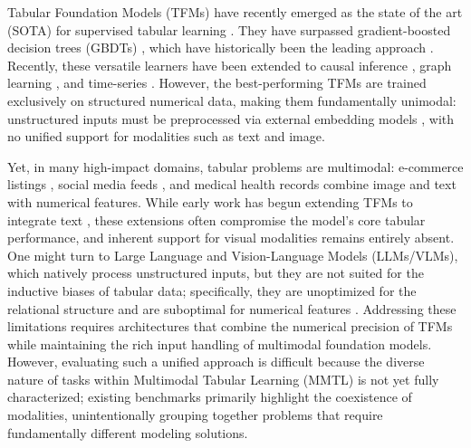 \documentclass{article}
\begin{document}
Tabular Foundation Models (TFMs) \cite{van_breugel_position_2024, hollmann_tabpfn_2022, hollmann_accurate_2025, qu_tabicl_2025, grinsztajn_tabpfn-25_2026, qu_tabiclv2_2026} have recently emerged as the state of the art (SOTA) for supervised tabular learning \cite{erickson_tabarena_2025, ye_closer_2025}. They have surpassed gradient-boosted decision trees (GBDTs) \cite{breiman_random_2001, chen_xgboost_2016, ke_lightgbm_2017, prokhorenkova_catboost_2018}, which have historically been the leading approach \cite{shwartz-ziv_tabular_2022, grinsztajn_why_2022, mcelfresh_when_2023}. Recently, these versatile learners have been extended to causal inference \cite{robertson_-pfn_2025}, graph learning \cite{hayler_bringing_2025}, and time-series \cite{hoo2024tabular}. However, the best-performing TFMs \cite{grinsztajn_tabpfn-25_2026, qu_tabiclv2_2026} are trained exclusively on structured numerical data, making them fundamentally unimodal: unstructured inputs must be preprocessed via external embedding models \cite{wang_text_2024, simeoni_dinov3_2025}, with no unified support for modalities such as text and image.

Yet, in many high-impact domains, tabular problems are multimodal: e-commerce listings \cite{das2024towards, sukel2024multimodal, shapira2024can}, social media feeds \cite{meghawat2018multimodal, ophir2020deep, badian2023social}, and medical health records \cite{huang_fusion_2020, cui_deep_2023, duenias_hyperfusion_2025, fu_unleashing_2025} combine image and text with numerical features. While early work has begun extending TFMs to integrate text \cite{arazi_tabstar_2025, spinaci_contexttab_2025}, these extensions often compromise the model's core tabular performance, and inherent support for visual modalities remains entirely absent. One might turn to Large Language and Vision-Language Models (LLMs/VLMs), which natively process unstructured inputs, but they are not suited for the inductive biases of tabular data; specifically, they are unoptimized for the relational structure \cite{fang_large_2024} and are suboptimal for numerical features \cite{van_breugel_position_2024}. Addressing these limitations requires architectures that combine the numerical precision of TFMs while maintaining the rich input handling of multimodal foundation models. However, evaluating such a unified approach is difficult because the diverse nature of tasks within Multimodal Tabular Learning (MMTL) \cite{jiang_representation_2026, kim_multimodalpfn_2025} is not yet fully characterized; existing benchmarks \cite{shi_benchmarking_2021, lu_mug_2023, kim_carte_2024, tang_bag_2024, mraz_towards_2025} primarily highlight the coexistence of modalities, unintentionally grouping together problems that require fundamentally different modeling solutions.
\end{document}
